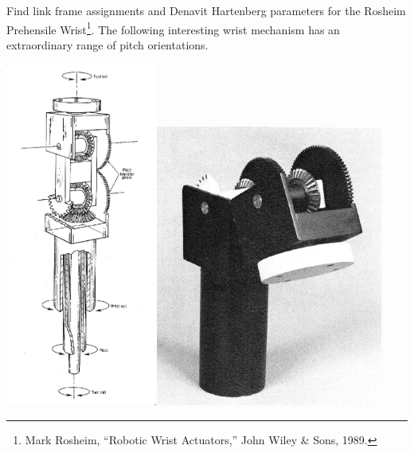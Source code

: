 \begin{Example}
Find link frame assignments and Denavit Hartenberg parameters for the Rosheim Prehensile Wrist\footnote{Mark Rosheim, ``Robotic Wrist Actuators,''  John Wiley \& Sons, 1989.}.   The following interesting wrist mechanism has an extraordinary range of pitch orientations.

\includegraphics[width=5cm]{figs03/00420.eps}\includegraphics[width=7.5cm]{figs03/rosheim_pre_photo.eps}

\end{Example}

